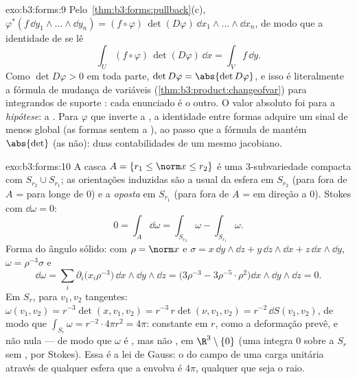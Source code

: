 \begin{solution}{exo:b3:forms:9}
Pelo~\cref{thm:b3:forms:pullback}(c),
$\varphi^*(f\,\dd y_1\wedge\dots\wedge\dd y_n) =
(f\circ\varphi)\,\det(D\varphi)\,\dd
x_1\wedge\dots\wedge\dd x_n$, de modo que a identidade de  se lê
\[
\int_U(f\circ\varphi)\,\det(D\varphi)\,\dd x = \int_Vf\,\dd
y .
\]
Como $\det D\varphi > 0$ em toda parte, $\det D\varphi =
\abs{\det D\varphi}$, e isso é literalmente a
fórmula de mudança de variáveis
(\cref{thm:b3:product:changeofvar}) para integrandos 
de suporte : cada enunciado é o
outro. O valor absoluto foi para a \emph{hipótese}:
a . Para $\varphi$ que inverte a , a identidade
entre formas adquire um sinal de menos global (as formas sentem a
), ao passo que a fórmula de  mantém $\abs{\det}$
(as  não): duas contabilidades de um mesmo jacobiano.
\end{solution}

\begin{solution}{exo:b3:forms:10}
A casca $A = \{r_1 \leq \norm x \leq r_2\}$ é uma
$3$-subvariedade compacta com  $S_{r_2}\cup S_{r_1}$; as
orientações induzidas são a  usual da esfera em
$S_{r_2}$ (para fora de $A$ = para longe de $0$) e a
\emph{oposta} em $S_{r_1}$ (para fora de $A$ = em direção a
$0$). Stokes com $\dd\omega = 0$:
\[
0 = \int_A\dd\omega = \int_{S_{r_2}}\omega -
\int_{S_{r_1}}\omega .
\]
Forma do ângulo sólido: com $\rho = \norm x$ e $\sigma =
x\,\dd y\wedge\dd z + y\,\dd z\wedge\dd x + z\,\dd
x\wedge\dd y$, $\omega = \rho^{-3}\sigma$ e
\[
\dd\omega = \sum_i\partial_i\bigl(x_i\rho^{-3}\bigr)\,
\dd x\wedge\dd y\wedge\dd z
= \bigl(3\rho^{-3} - 3\rho^{-5}\cdot\rho^2\bigr)\dd
x\wedge\dd y\wedge\dd z = 0 .
\]
Em $S_r$, para $v_1, v_2$ tangentes: $\omega(v_1, v_2) =
r^{-3}\det(x, v_1, v_2) = r^{-3}\,r\det(\nu, v_1, v_2) =
r^{-2}\,\dd S(v_1, v_2)$, de modo que $\int_{S_r}\omega =
r^{-2}\cdot4\pi r^2 = 4\pi$: constante em $r$, como a deformação
prevê, e não nula --- de modo que $\omega$ é , mas não
, em $\R^3\setminus\{0\}$ (uma  integra
$0$ sobre a $S_r$ sem , por Stokes). Essa é a lei de Gauss:
o  do campo de uma carga unitária através de qualquer esfera que a
envolva é $4\pi$, qualquer que seja o raio.
\end{solution}

